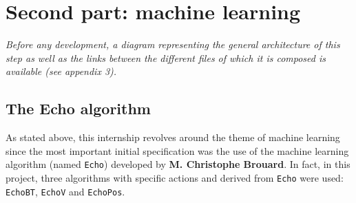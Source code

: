 \documentclass[12pt]{article}
\begin{document}

\newpage
\section{Second part: machine learning}

\textit{Before any development, a diagram representing the general architecture of this step as well as the links between the different files of which it is composed is available (see \textsl{appendix 3}).}

\subsection{The Echo algorithm}

As stated above, this internship revolves around the theme of machine learning since the most important initial specification was the use of the machine learning algorithm (named \texttt{Echo}) developed by \textbf{M. Christophe Brouard}. In fact, in this project, three algorithms with specific actions and derived from \texttt{Echo} were used: \texttt{EchoBT}, \texttt{EchoV} and \texttt{EchoPos}.
\end{document}
